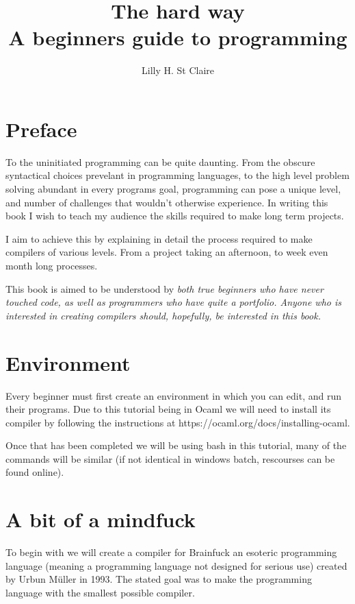 \documentclass[12pt]{article}
\begin{document}
\title{
    The hard way \\
    \large A beginners guide to programming
}
\author{Lilly H. St Claire}
\maketitle
\pagebreak
\tableofcontents
\pagebreak

\section{Preface}

To the uninitiated programming can be quite daunting.
From the obscure syntactical choices prevelant in
programming languages, to the high level problem
solving abundant in every programs goal, programming
can pose a unique level, and number of challenges
that wouldn't otherwise experience. In writing this
book I wish to teach my audience the skills required
to make long term projects.

I aim to achieve this by explaining in detail the
process required to make compilers of various levels.
From a project taking an afternoon, to week even
month long processes.

This book is aimed to be understood by \it both \rm
true beginners who have never touched code, as well
as programmers who have quite a portfolio. Anyone
who is interested in creating compilers should,
hopefully, be interested in this book.

\section{Environment}

Every beginner must first create an environment in which
you can edit, and run their programs. Due to this tutorial
being in Ocaml we will need to install its compiler by
following the instructions at
https://ocaml.org/docs/installing-ocaml.

Once that has been completed we will be using bash in this
tutorial, many of the commands will be similar (if not
identical in windows batch, rescourses can be found online).

\section{A bit of a mindfuck}

To begin with we will create a compiler for Brainfuck
an esoteric programming language (meaning a programming
language not designed for serious use) created by
Urbun M\"uller in 1993. The stated goal was to make the
programming language with the smallest possible compiler.
\end{document}
